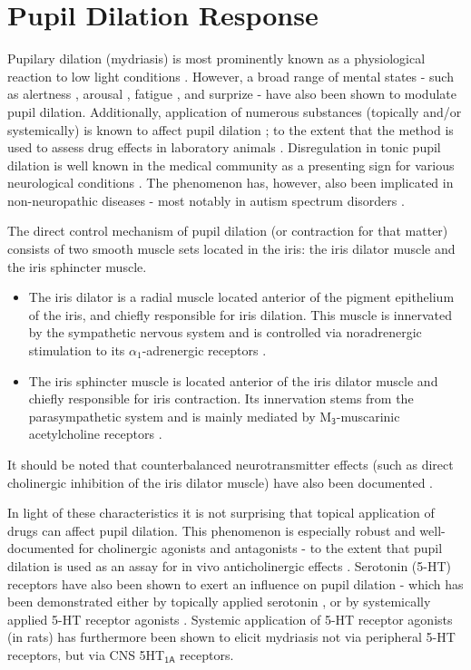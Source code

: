     \section{Pupil Dilation Response}
	Pupilary dilation (mydriasis) is most prominently known as a physiological reaction to low light conditions \citep{Ellis1981}. 
	However, a broad range of mental states - 
	such as alertness \citep{Yoss1970}, arousal \citep{Bradshaw1967}, fatigue \citep{Morad2000}, and surprize \citep{Preuschoff2011} -
	have also been shown to modulate pupil dilation.
	Additionally, application of numerous substances (topically and/or systemically) is known to affect pupil dilation \citep{Theofilopoulos1988, Bye1979, Phillips2000}; to the extent that the method is used to assess drug effects in laboratory animals \citep{Murray1981}.
	Disregulation in tonic pupil dilation is well known in the medical community as a presenting sign for various neurological conditions \citep{Caglayan2013}.
	The phenomenon has, however, also been implicated in non-neuropathic diseases - most notably in autism spectrum disorders \citep{Anderson2013}.
	
	The direct control mechanism of pupil dilation (or contraction for that matter) consists of two smooth muscle sets located in the iris: the iris dilator muscle and the iris sphincter muscle.
	\begin{itemize}
	    \item The iris dilator is a radial muscle located anterior of the pigment epithelium of the iris, and chiefly responsible for iris dilation.
	    This muscle is innervated by the sympathetic nervous system and is controlled via noradrenergic stimulation to its $\alpha_1$-adrenergic receptors \citep{vanAlphen1976}.
	    \item The iris sphincter muscle is located anterior of the iris dilator muscle and chiefly responsible for iris contraction.
	    Its innervation stems from the parasympathetic system and is mainly mediated by M$\mathsf{_3}$-muscarinic acetylcholine receptors \citep{Woldemussie1993,Taylor1974}.
	\end{itemize}
	It should be noted that counterbalanced neurotransmitter effects (such as direct cholinergic inhibition of the iris dilator muscle) have also been documented \citep{Yoshitomi1985}.
	
	In light of these characteristics it is not surprising that topical application of drugs can affect pupil dilation.
	This phenomenon is especially robust and well-documented for cholinergic agonists \citep{Smith1978} and antagonists \citep{Gambill1967} -
	to the extent that pupil dilation is used as an assay for in vivo anticholinergic effects \citep{Bye1979}.
	Serotonin (5-HT) receptors have also been shown to exert an influence on pupil dilation - which has been demonstrated either by topically applied serotonin \citep{KOELLA1962}, or by systemically applied 5-HT receptor agonists \citep{Yu2004}.
	Systemic application of 5-HT receptor agonists (in rats) has furthermore been shown to elicit mydriasis not via peripheral 5-HT receptors, but via CNS 5HT$\mathsf{_{1A}}$ receptors.
	
